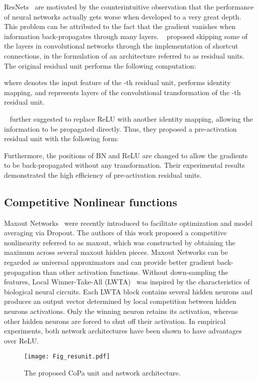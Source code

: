 \documentclass[wcp]{jmlr}
\begin{document}
ResNets~\citep{he2015deep} are motivated by the counterintuitive observation that the performance of neural networks actually gets worse when developed to a very great depth. 
This problem can be attributed to the fact that the gradient vanishes when information back-propagates through many layers. 
~\cite{he2015deep} proposed skipping some of the layers in convolutional networks through the implementation of shortcut connections, in the formulation of an architecture referred to as residual units. The original residual unit performs the following computation:

where  denotes the input feature of the -th residual unit,  performs identity mapping, and  represents layers of the convolutional transformation of the -th residual unit.

~\cite{he2016identity} further suggested to replace ReLU with another identity mapping, allowing the information to be propagated directly. 
Thus, they proposed a pre-activation residual unit with the following form:

Furthermore, the positions of BN and ReLU are changed to allow the gradients to be back-propagated without any transformation.
Their experimental results demonstrated the high efficiency of pre-activation residual units.

\subsection{Competitive Nonlinear functions}
Maxout Networks~\citep{goodfellow2013maxout} were recently introduced to facilitate optimization and model averaging via Dropout. The authors of this work proposed a competitive nonlinearity referred to as maxout, which was constructed by obtaining the maximum across several maxout hidden pieces. Maxout Networks can be regarded as universal approximators and can provide better gradient back-propagation than other activation functions.
Without down-sampling the features, Local Winner-Take-All (LWTA)~\citep{srivastava2013compete} was inspired by the characteristics of biological neural circuits. 
Each LWTA block contains several hidden neurons and produces an output vector determined by local competition between hidden neurons activations.
Only the winning neuron retains its activation, whereas other hidden neurons are forced to shut off their activation.
In empirical experiments, both network architectures have been shown to have advantages over ReLU.


\begin{figure*}
\begin{center}
	\texttt{[image: Fig\_resunit.pdf]}
\end{center}
   \caption{The proposed CoPa unit and network architecture.}
\label{resunit}
\end{figure*}
\end{document}
